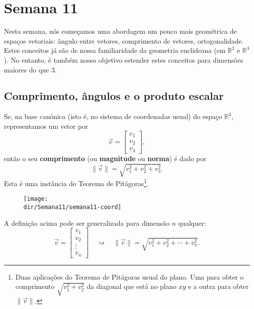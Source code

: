 \documentclass[../livro.tex]{subfiles}  %
\providecommand{\dir}{..}
\begin{document}
\chapter{Semana 11}


Nesta semana, nós começamos uma abordagem um pouco mais geométrica de espaços vetoriais: ângulo entre vetores, comprimento de vetores, ortogonalidade. Estes conceitos já são de nossa familiaridade da geometria euclideana (em $\mathbb{R}^2$ e $\mathbb{R}^3$). No entanto, é também nosso objetivo estender estes conceitos para dimensões maiores do que $3$.


\section{Comprimento, ângulos e o produto escalar}

Se, na base canônica (isto é, no sistema de coordenadas usual) do espaço $\mathbb{R}^3$, representamos um vetor por
\begin{equation}
\vec{v} =
\begin{bmatrix}
v_1 \\ v_2 \\ v_3
\end{bmatrix},
\end{equation} então o seu \textbf{comprimento} (ou \textbf{magnitude} ou \textbf{norma}) é dado por
\begin{equation}
\|\vec{v}\| = \sqrt{v_1^2 + v_2^2 + v_3^2}.
\end{equation} Esta é uma instância do Teorema de Pitágoras\footnote{Duas aplicações do Teorema de Pitágoras usual do plano. Uma para obter o comprimento $\sqrt{v_1^2 + v_2^2}$ da diagonal que está no plano $xy$ e a outra para obter $\|\vec{v}\|$.}.

\begin{figure}[h!]
	\begin{center}
		\texttt{[image: \\dir/Semana11/semana11-coord]}
	\end{center}
\end{figure}

\noindent A definição acima pode ser generalizada para dimensão $n$ qualquer:
\begin{equation}
\vec{v} =
\begin{bmatrix}
v_1 \\ v_2 \\ \vdots \\ v_n
\end{bmatrix} \quad \rightsquigarrow \quad \|\vec{v}\| = \sqrt{v_1^2 + v_2^2 + \cdots + v_n^2}.
\end{equation}
\end{document}
